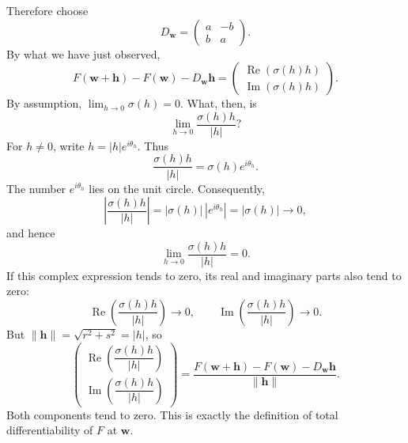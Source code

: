 \documentclass[11pt]{article}
\newcommand{\ww}{\mathbf w}
\newcommand{\hh}{\mathbf h}
\DeclareMathOperator{\Real}{Re}
\DeclareMathOperator{\Imag}{Im}
\begin{document}
Therefore choose
\[
 D_{\ww}=\begin{pmatrix}a&-b\\b&a\end{pmatrix}.
\]
By what we have just observed,
\[
 F(\ww+\hh)-F(\ww)-D_{\ww}\hh
 =\begin{pmatrix}\Real(\sigma(h)h)\\\Imag(\sigma(h)h)\end{pmatrix}.
\]
By assumption, $\lim_{h\to0}\sigma(h)=0$. What, then, is
\[
 \lim_{h\to0}\frac{\sigma(h)h}{|h|}?
\]
For $h\ne0$, write $h=|h|e^{i\theta_h}$. Thus
\[
 \frac{\sigma(h)h}{|h|}=\sigma(h)e^{i\theta_h}.
\]
The number $e^{i\theta_h}$ lies on the unit circle. Consequently,
\[
 \left|\frac{\sigma(h)h}{|h|}\right|
 =|\sigma(h)|\,|e^{i\theta_h}|=|\sigma(h)|\longrightarrow0,
\]
and hence
\[
 \lim_{h\to0}\frac{\sigma(h)h}{|h|}=0.
\]
If this complex expression tends to zero, its real and imaginary parts
also tend to zero:
\[
 \Real\left(\frac{\sigma(h)h}{|h|}\right)\longrightarrow0,
 \qquad
 \Imag\left(\frac{\sigma(h)h}{|h|}\right)\longrightarrow0.
\]
But $\|\hh\|=\sqrt{r^2+s^2}=|h|$, so
\[
 \begin{pmatrix}
 \Real\left(\dfrac{\sigma(h)h}{|h|}\right)\\[0.7em]
 \Imag\left(\dfrac{\sigma(h)h}{|h|}\right)
 \end{pmatrix}
 =\frac{F(\ww+\hh)-F(\ww)-D_{\ww}\hh}{\|\hh\|}.
\]
Both components tend to zero. This is exactly the definition of total
differentiability of $F$ at $\ww$.

\end{document}
